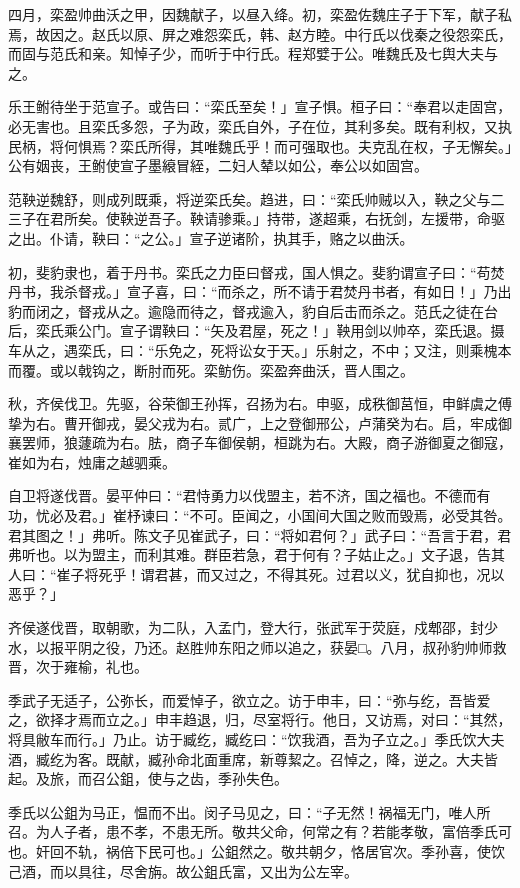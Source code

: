 \documentclass[]{article}
\begin{document}
四月，栾盈帅曲沃之甲，因魏献子，以昼入绛。初，栾盈佐魏庄子于下军，献子私焉，故因之。赵氏以原、屏之难怨栾氏，韩、赵方睦。中行氏以伐秦之役怨栾氏，而固与范氏和亲。知悼子少，而听于中行氏。程郑嬖于公。唯魏氏及七舆大夫与之。

乐王鲋待坐于范宣子。或告曰：``栾氏至矣！」宣子惧。桓子曰：``奉君以走固宫，必无害也。且栾氏多怨，子为政，栾氏自外，子在位，其利多矣。既有利权，又执民柄，将何惧焉？栾氏所得，其唯魏氏乎！而可强取也。夫克乱在权，子无懈矣。」公有姻丧，王鲋使宣子墨縗冒絰，二妇人辇以如公，奉公以如固宫。

范鞅逆魏舒，则成列既乘，将逆栾氏矣。趋进，曰：``栾氏帅贼以入，鞅之父与二三子在君所矣。使鞅逆吾子。鞅请骖乘。」持带，遂超乘，右抚剑，左援带，命驱之出。仆请，鞅曰：``之公。」宣子逆诸阶，执其手，赂之以曲沃。

初，斐豹隶也，着于丹书。栾氏之力臣曰督戎，国人惧之。斐豹谓宣子曰：``苟焚丹书，我杀督戎。」宣子喜，曰：``而杀之，所不请于君焚丹书者，有如日！」乃出豹而闭之，督戎从之。逾隐而待之，督戎逾入，豹自后击而杀之。范氏之徒在台后，栾氏乘公门。宣子谓鞅曰：``矢及君屋，死之！」鞅用剑以帅卒，栾氏退。摄车从之，遇栾氏，曰：``乐免之，死将讼女于天。」乐射之，不中；又注，则乘槐本而覆。或以戟钩之，断肘而死。栾鲂伤。栾盈奔曲沃，晋人围之。

秋，齐侯伐卫。先驱，谷荣御王孙挥，召扬为右。申驱，成秩御莒恒，申鲜虞之傅挚为右。曹开御戎，晏父戎为右。贰广，上之登御邢公，卢蒲癸为右。启，牢成御襄罢师，狼蘧疏为右。胠，商子车御侯朝，桓跳为右。大殿，商子游御夏之御寇，崔如为右，烛庸之越驷乘。

自卫将遂伐晋。晏平仲曰：``君恃勇力以伐盟主，若不济，国之福也。不德而有功，忧必及君。」崔杼谏曰：``不可。臣闻之，小国间大国之败而毁焉，必受其咎。君其图之！」弗听。陈文子见崔武子，曰：``将如君何？」武子曰：``吾言于君，君弗听也。以为盟主，而利其难。群臣若急，君于何有？子姑止之。」文子退，告其人曰：``崔子将死乎！谓君甚，而又过之，不得其死。过君以义，犹自抑也，况以恶乎？」

齐侯遂伐晋，取朝歌，为二队，入孟门，登大行，张武军于荧庭，戍郫邵，封少水，以报平阴之役，乃还。赵胜帅东阳之师以追之，获晏□。八月，叔孙豹帅师救晋，次于雍榆，礼也。

季武子无适子，公弥长，而爱悼子，欲立之。访于申丰，曰：``弥与纥，吾皆爱之，欲择才焉而立之。」申丰趋退，归，尽室将行。他日，又访焉，对曰：``其然，将具敝车而行。」乃止。访于臧纥，臧纥曰：``饮我酒，吾为子立之。」季氏饮大夫酒，臧纥为客。既献，臧孙命北面重席，新尊絜之。召悼之，降，逆之。大夫皆起。及旅，而召公鉏，使与之齿，季孙失色。

季氏以公鉏为马正，愠而不出。闵子马见之，曰：``子无然！祸福无门，唯人所召。为人子者，患不孝，不患无所。敬共父命，何常之有？若能孝敬，富倍季氏可也。奸回不轨，祸倍下民可也。」公鉏然之。敬共朝夕，恪居官次。季孙喜，使饮己酒，而以具往，尽舍旃。故公鉏氏富，又出为公左宰。
\end{document}
